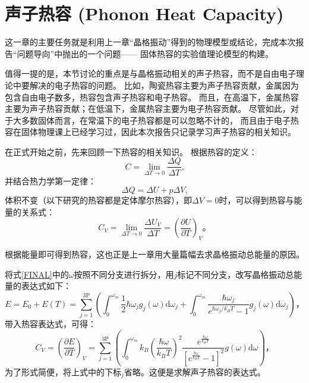 \documentclass[declarePage]{ecnuthesis}
\begin{document}
\chapter{声子热容 (Phonon Heat Capacity)}
这一章的主要任务就是利用上一章“晶格振动”得到的物理模型或结论，完成本次报告“问题导向”中抛出的一个问题——%
固体热容的实验值理论模型的构建。

值得一提的是，本节讨论的重点是与晶格振动相关的声子热容，而不是自由电子理论中要解决的电子热容的问题。%
比如，陶瓷热容主要为声子热容贡献，金属因为包含自由电子数多，热容包含声子热容和电子热容。%
而且，在高温下，金属热容主要为声子热容贡献；在低温下，金属热容主要为电子热容贡献。%
尽管如此，对于大多数固体而言，在常温下的电子热容都是可以忽略不计的，%
而且由于电子热容在固体物理课上已经学习过，因此本次报告只记录学习声子热容的相关知识。

在正式开始之前，先来回顾一下热容的相关知识。
根据热容的定义：
\begin{equation}
    C = \lim_{\Delta T \rightarrow 0} \frac{\Delta Q}{\Delta T} \text{,}
\end{equation}
并结合热力学第一定律：
\begin{equation}
    \Delta Q = \Delta U + p \Delta V \text{,}
\end{equation}
体积不变（以下研究的热容都是定体摩尔热容），即$\Delta V = 0$时，可以得到热容与能量的关系式：
\begin{equation}
    C_V = \lim_{\Delta T \rightarrow 0} \frac{\Delta U_V}{\Delta T} = \left( \frac{\partial U}{\partial T} \right) _V \text{。}
\end{equation}

根据能量即可得到热容，这也正是上一章用大量篇幅去求晶格振动总能量的原因。

将式\ref{FINAL}中的$\omega$按照不同分支进行拆分，用$j$标记不同分支，改写晶格振动总能量的表达式如下：
\begin{equation}
    E = E_0 + E(T) = \sum_{j=1}^{3\mathrm{P}}\left(\int_{0}^{\omega_m} \frac{1}{2}\hbar \omega_j g_j(\omega) \mathrm{d}\omega_j + \int_{0}^{\omega_m} \frac{\hbar \omega_j}{e^{\hbar \omega_j / k_B T}-1} g_j(\omega) \mathrm{d}\omega_j\right) \text{，} \label{FINAL2}
\end{equation}
带入热容表达式，可得：
\begin{equation}
    C_V = \left( \frac{\partial E}{\partial T} \right) _V = \sum_{j=1}^{3\mathrm{P}}\left( \int_{0}^{\omega_m} k_B \left( \frac{\hbar \omega}{k_BT}\right) ^2 \frac{e^{\frac{\hbar \omega}{k_BT}}}{\left[e^ \frac{\hbar \omega}{k_BT}-1 \right]^2} g(\omega) \mathrm{d}\omega \right) \text{，} \label{CFI}
\end{equation}
为了形式简便，将上式中的下标$_j$省略。这便是求解声子热容的表达式。
\end{document}
